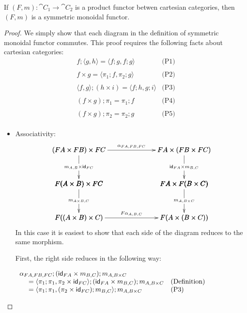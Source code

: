 \begin{lemma}
  \label{lemma:product_functors_are_symmetric_monoidal}
  If $(F,m) : \cat{C}_1 \to \cat{C}_2$ is a product functor betwen cartesian categories, then
  $(F,m)$ is a symmetric monoidal functor.
\end{lemma}
\iffalse
\begin{proof}
  We simply show that each diagram in the definition of symmetric
  monoidal functor commutes.  This proof requires the following facts
  about cartesian categories:
  \[
  \begin{array}{lll}
    f;\langle g , h \rangle = \langle f;g, f;g \rangle & \text{(P1)}\\
    \\
    f \times g = \langle \pi_1;f , \pi_2;g \rangle & \text{(P2)}\\
    \\
    \langle f , g \rangle;(h \times i) = \langle f;h, g;i \rangle & \text{(P3)}\\
    \\
    (f \times g);\pi_1 = \pi_1;f & \text{(P4)}\\
    \\
    (f \times g);\pi_2 = \pi_2;g & \text{(P5)}\\
  \end{array}
  \]
  \begin{itemize}
  \item[] Associativity:\ \\
    \[
    \bfig
    \vSquares|ammmmma|/->`->`->``->`->`->/[
      (FA \times FB) \times FC`
      FA \times (FB \times FC)`
      F(A \times B) \times FC`
      FA \times F(B \times C)`
      F((A \times B) \times C)`
      F(A \times (B \times C));
      {\alpha}_{FA,FB,FC}`
      m_{A,B} \times \id_{FC}`
      \id_{FA} \times m_{B,C}``
      m_{A \times B,C}`
      m_{A,B \times C}`
      F{\alpha}_{A,B,C}]
    \efig
    \]
    In this case it is easiest to show that each side of the diagram
    reduces to the same morphism.

    First, the right side reduces in the following way:
    \begin{center}
      \begin{math}
        \begin{array}{lll}
          \alpha_{FA,FB,FC};(\mathsf{id}_{FA} \times m_{B,C});m_{A,B \times C} \\
          \,\,\,\,\,\,\,\,= \langle \pi_1;\pi_1, \pi_2 \times \mathsf{id}_{FC} \rangle;(\mathsf{id}_{FA} \times m_{B,C});m_{A,B \times C} & \text{(Definition)}\\
          \,\,\,\,\,\,\,\,= \langle \pi_1;\pi_1, (\pi_2 \times \mathsf{id}_{FC});m_{B,C} \rangle;m_{A,B \times C} & \text{(P3)}\\
        \end{array}
      \end{math}
    \end{center}


\end{itemize}
\end{proof}
